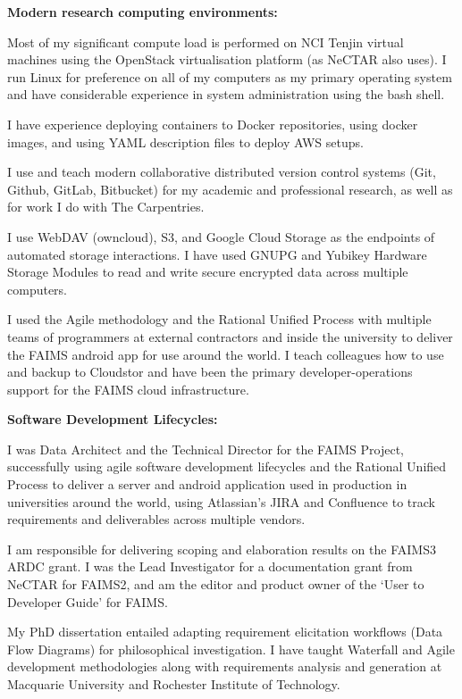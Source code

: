 \documentclass[11pt, a4paper]{awesome-cv}
\begin{document}
\begin{cvletter}

\textbf{Modern research computing environments:} 
\begin{letteritems}
\item {Most of my significant compute load is performed on NCI Tenjin virtual machines using the OpenStack virtualisation platform (as NeCTAR also uses). I run Linux for preference on all of my computers as my primary operating system and have considerable experience in system administration using the bash shell.} 
\item {I have experience deploying containers to Docker repositories, using docker images, and using YAML description files to deploy AWS setups.}
\item {I use and teach modern collaborative distributed version control systems (Git, Github, GitLab, Bitbucket) for my academic and professional research, as well as for work I do with The Carpentries.}
\item {I use WebDAV (owncloud), S3, and Google Cloud Storage as the endpoints of automated storage interactions. I have used GNUPG and Yubikey Hardware Storage Modules to read and write secure encrypted data across multiple computers. }
\end{letteritems}



I used the Agile methodology and the Rational Unified Process with multiple teams of programmers at external contractors and inside the university to deliver the FAIMS android app for use around the world. I teach colleagues how to use and backup to Cloudstor and have been the primary developer-operations support for the FAIMS cloud infrastructure. 


\textbf{Software Development Lifecycles:} 
\begin{letteritems}
\item {I was Data Architect and the Technical Director for the FAIMS Project, successfully using agile software development lifecycles and the Rational Unified Process to deliver a server and android application used in production in universities around the world, using Atlassian's JIRA and Confluence to track requirements and deliverables across multiple vendors.}
\item {I am responsible for delivering scoping and elaboration results on the FAIMS3 ARDC grant. I was the Lead Investigator for a documentation grant from NeCTAR for FAIMS2, and am the editor and product owner of the `User to Developer Guide' for FAIMS.}
\item {My PhD dissertation entailed adapting requirement elicitation workflows (Data Flow Diagrams) for philosophical investigation. I have taught Waterfall and Agile development methodologies along with requirements analysis and generation at Macquarie University and Rochester Institute of Technology.}
\end{letteritems}


\end{cvletter}
\end{document}
